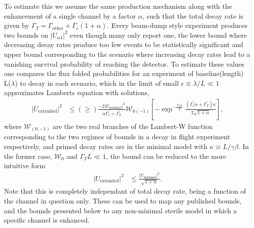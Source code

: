 \documentclass[11pt, a4paper]{article}
\begin{document}
To estimate this we assume the same production mechanism along with the enhancement of a single channel by a
factor $\alpha$, such that the total decay rate is given by $\Gamma_T =
\Gamma_\text{other}+\Gamma_c (1+\alpha)$. Every beam-dump style experiment produces two bounds on $|U_{\alpha 4}|^2$ even though many only report one, the
lower bound where decreasing decay rates produce too few events to be
statistically significant and upper bound corresponding to the scenario where
increasing decay rates lead to a vanishing survival probability of reaching the
detector. To estimate these values one compares the flux folded probabilities
for an experiment of baseline(length) L($\lambda$) to decay in each scenario,
which in the limit of small $\epsilon \equiv \lambda/L \ll 1$ approximates
Lamberts equation with solutions, \begin{align*} |U_\text{extended}|^2 &\leq (\geq)
\frac{-2 |U_\text{minimal}|^2}{\alpha \Gamma^\prime_c +\Gamma^\prime_T}
\mathcal{W}_{0(-1)}\left[-\exp^{-\frac{\Gamma^\prime_T \kappa}{2}}
\frac{(\Gamma^\prime_c \alpha + \Gamma^\prime_T)\kappa}{2\sqrt{1+\alpha}}
\right], \end{align*} where $\mathcal{W}_{(0,-1)}$ are the two real branches of
the Lambert-W function corresponding to the two regimes of bounds in a decay in
flight experiment respectively, and primed decay rates are in the minimal model
with $\kappa \equiv L/\gamma \beta$. In the former case, $\mathcal{W}_0$ and
$\Gamma_T L \ll 1$, the bound can be reduced to the more intuitive form
\begin{align*} |U_\text{extended}|^2 &\leq
\frac{|U_{\text{minimal}}|^2}{\sqrt{1+\alpha}}.  \end{align*} Note that this is completely independant of total decay rate, being a function of the channel in question only. 
These can be used to map any published bounds, and the bounds presented below to any non-minimal sterile model in which a specific channel is enhanced.\\
\end{document}
